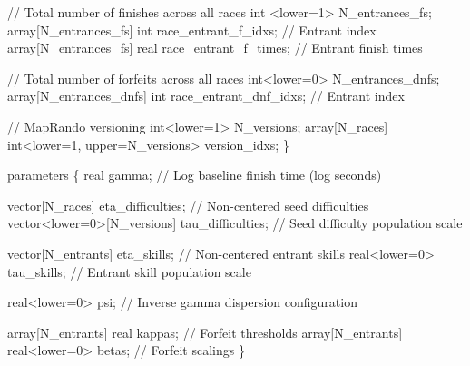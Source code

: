 \documentclass[
  letterpaper,
  DIV=11,
  numbers=noendperiod]{scrartcl}
\newenvironment{Shaded}{\begin{snugshade}}{\end{snugshade}}
\newcommand{\CommentTok}[1]{\textcolor[rgb]{0.37,0.37,0.37}{#1}}
\newcommand{\DataTypeTok}[1]{\textcolor[rgb]{0.68,0.00,0.00}{#1}}
\newcommand{\DecValTok}[1]{\textcolor[rgb]{0.68,0.00,0.00}{#1}}
\newcommand{\KeywordTok}[1]{\textcolor[rgb]{0.00,0.23,0.31}{#1}}
\newcommand{\NormalTok}[1]{\textcolor[rgb]{0.00,0.23,0.31}{#1}}
\begin{document}
\begin{codelisting}
\begin{Shaded}
\begin{Highlighting}[]
  \CommentTok{// Total number of finishes across all races}
  \DataTypeTok{int}\NormalTok{ \textless{}}\KeywordTok{lower}\NormalTok{=}\DecValTok{1}\NormalTok{\textgreater{} N\_entrances\_fs;}
  \DataTypeTok{array}\NormalTok{[N\_entrances\_fs] }\DataTypeTok{int}\NormalTok{ race\_entrant\_f\_idxs;   }\CommentTok{// Entrant index}
  \DataTypeTok{array}\NormalTok{[N\_entrances\_fs] }\DataTypeTok{real}\NormalTok{ race\_entrant\_f\_times; }\CommentTok{// Entrant finish times}

  \CommentTok{// Total number of forfeits across all races}
  \DataTypeTok{int}\NormalTok{\textless{}}\KeywordTok{lower}\NormalTok{=}\DecValTok{0}\NormalTok{\textgreater{} N\_entrances\_dnfs;}
  \DataTypeTok{array}\NormalTok{[N\_entrances\_dnfs] }\DataTypeTok{int}\NormalTok{ race\_entrant\_dnf\_idxs; }\CommentTok{// Entrant index}

  \CommentTok{// MapRando versioning}
  \DataTypeTok{int}\NormalTok{\textless{}}\KeywordTok{lower}\NormalTok{=}\DecValTok{1}\NormalTok{\textgreater{} N\_versions;}
  \DataTypeTok{array}\NormalTok{[N\_races] }\DataTypeTok{int}\NormalTok{\textless{}}\KeywordTok{lower}\NormalTok{=}\DecValTok{1}\NormalTok{, }\KeywordTok{upper}\NormalTok{=N\_versions\textgreater{} version\_idxs;}
\NormalTok{\}}

\KeywordTok{parameters}\NormalTok{ \{}
  \DataTypeTok{real}\NormalTok{ gamma;                       }\CommentTok{// Log baseline finish time (log seconds)}

  \DataTypeTok{vector}\NormalTok{[N\_races] eta\_difficulties; }\CommentTok{// Non{-}centered seed difficulties}
  \DataTypeTok{vector}\NormalTok{\textless{}}\KeywordTok{lower}\NormalTok{=}\DecValTok{0}\NormalTok{\textgreater{}[N\_versions] tau\_difficulties; }\CommentTok{// Seed difficulty population scale}

  \DataTypeTok{vector}\NormalTok{[N\_entrants] eta\_skills;    }\CommentTok{// Non{-}centered entrant skills}
  \DataTypeTok{real}\NormalTok{\textless{}}\KeywordTok{lower}\NormalTok{=}\DecValTok{0}\NormalTok{\textgreater{} tau\_skills;         }\CommentTok{// Entrant skill population scale}

  \DataTypeTok{real}\NormalTok{\textless{}}\KeywordTok{lower}\NormalTok{=}\DecValTok{0}\NormalTok{\textgreater{} psi;                }\CommentTok{// Inverse gamma dispersion configuration}

  \DataTypeTok{array}\NormalTok{[N\_entrants] }\DataTypeTok{real}\NormalTok{ kappas;         }\CommentTok{// Forfeit thresholds}
  \DataTypeTok{array}\NormalTok{[N\_entrants] }\DataTypeTok{real}\NormalTok{\textless{}}\KeywordTok{lower}\NormalTok{=}\DecValTok{0}\NormalTok{\textgreater{} betas; }\CommentTok{// Forfeit scalings}
\NormalTok{\}}


\end{Highlighting}
\end{Shaded}
\end{codelisting}
\end{document}
